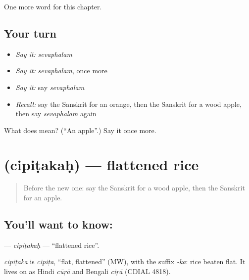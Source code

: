 \begin{grammarlens}[title={What you've built}]
One more word for this chapter.
\end{grammarlens}

\subsection*{Your turn}
\begin{itemize}
\raggedright
  \item \emph{Say it:} \emph{sevaphalam}
  \item \emph{Say it:} \emph{sevaphalam}, once more
  \item \emph{Say it:} say \emph{sevaphalam}
  \item \emph{Recall:} say the Sanskrit for an orange, then the Sanskrit for a wood apple, then say \emph{sevaphalam} again
\end{itemize}

\begin{tcolorbox}[breakable,colback=teal!4,colframe=teal!35!black,title={Before you move on}]
What does  mean? (\textquotedblleft{}An apple\textquotedblright{}.) Say it once more.
\end{tcolorbox}
\section[\texorpdfstring{\sk{चिपिटकः} (cipiṭakaḥ)}{चिपिटकः (cipiṭakaḥ)}]{ (cipiṭakaḥ) — flattened rice}

\label{lesson:SA-C219-cipitakah}



\begin{quote}
Before the new one: say the Sanskrit for a wood apple, then the Sanskrit for an apple.
\end{quote}

\subsection*{You'll want to know: }
\textbf{} — \emph{cipiṭakaḥ} — \textquotedblleft{}flattened rice\textquotedblright{}.

\begin{cousinweb}
\emph{cipiṭaka} is \emph{cipiṭa}, \textquotedblleft{}flat, flattened\textquotedblright{} (MW), with the suffix \emph{-ka}: rice beaten flat. It lives on as Hindi \emph{cūṛā} and Bengali \emph{ciṛā} (CDIAL 4818).
\end{cousinweb}

